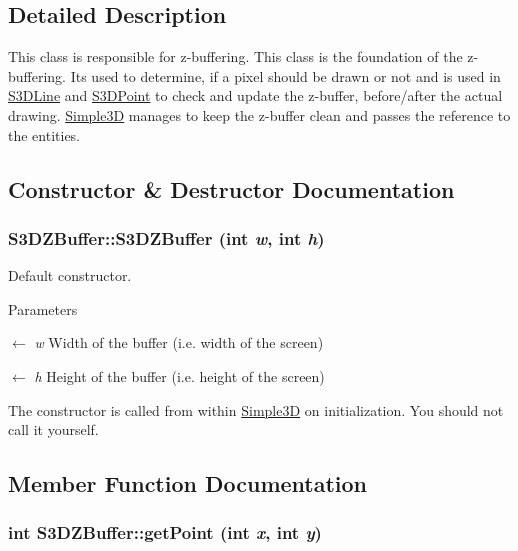 \subsection{Detailed Description}
This class is responsible for z-\/buffering. This class is the foundation of the z-\/buffering. Its used to determine, if a pixel should be drawn or not and is used in \hyperlink{class_s3_d_line}{S3DLine} and \hyperlink{class_s3_d_point}{S3DPoint} to check and update the z-\/buffer, before/after the actual drawing. \hyperlink{class_simple3_d}{Simple3D} manages to keep the z-\/buffer clean and passes the reference to the entities. 

\subsection{Constructor \& Destructor Documentation}
\hypertarget{class_s3_d_z_buffer_a8983fb4278e5baaa4bdf076f8e28d940}{
\subsubsection[{S3DZBuffer}]{\setlength{\rightskip}{0pt plus 5cm}S3DZBuffer::S3DZBuffer (int {\em w}, \/  int {\em h})}}
\label{class_s3_d_z_buffer_a8983fb4278e5baaa4bdf076f8e28d940}


Default constructor. 


\begin{DoxyParams}{Parameters}
\item[\mbox{$\leftarrow$} {\em w}]Width of the buffer (i.e. width of the screen) \item[\mbox{$\leftarrow$} {\em h}]Height of the buffer (i.e. height of the screen)\end{DoxyParams}
The constructor is called from within \hyperlink{class_simple3_d}{Simple3D} on initialization. You should not call it yourself. 

\subsection{Member Function Documentation}
\hypertarget{class_s3_d_z_buffer_aba5f79850772a0500a629443e413e402}{
\subsubsection[{getPoint}]{\setlength{\rightskip}{0pt plus 5cm}int S3DZBuffer::getPoint (int {\em x}, \/  int {\em y})}}
\label{class_s3_d_z_buffer_aba5f79850772a0500a629443e413e402}


